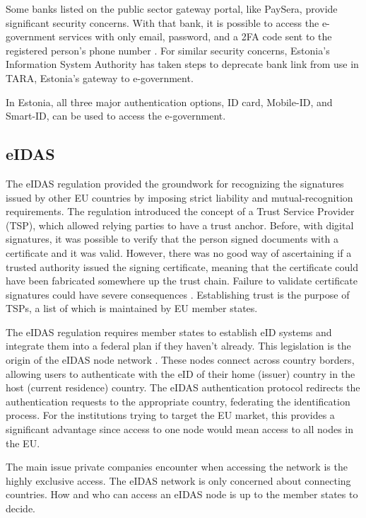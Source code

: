 Some banks listed on the public sector gateway portal, like PaySera, provide significant security concerns. With that bank, it is possible to access the e-government services with only email, password, and a 2FA code sent to the registered person's phone number . For similar security concerns, Estonia's Information System Authority has taken steps to deprecate bank link \cite{ria-deprecates-bank-link} from use in TARA, Estonia's gateway to e-government.

In Estonia, all three major authentication options, ID card, Mobile-ID, and Smart-ID, can be used to access the e-government.

\subsection{eIDAS}

The eIDAS regulation \cite{eulaw-eidas} provided the groundwork for recognizing the signatures issued by other EU countries by imposing strict liability and mutual-recognition requirements. The regulation introduced the concept of a Trust Service Provider (TSP), which allowed relying parties to have a trust anchor. Before, with digital signatures, it was possible to verify that the person signed documents with a certificate and it was valid. However, there was no good way of ascertaining if a trusted authority issued the signing certificate, meaning that the certificate could have been fabricated somewhere up the trust chain. Failure to validate certificate signatures could have severe consequences \cite{seb-auth-bypass}. Establishing trust is the purpose of TSPs, a list of which is maintained by EU member states.

The eIDAS regulation requires member states to establish eID systems and integrate them into a federal plan if they haven't already. This legislation is the origin of the eIDAS node network \cite{carretero2018federated}. These nodes connect across country borders, allowing users to authenticate with the eID of their home (issuer) country in the host (current residence) country. The eIDAS authentication protocol redirects the authentication requests to the appropriate country, federating the identification process. For the institutions trying to target the EU market, this provides a significant advantage since access to one node would mean access to all nodes in the EU.

The main issue private companies encounter when accessing the network is the highly exclusive access. The eIDAS network is only concerned about connecting countries. How and who can access an eIDAS node is up to the member states to decide.

